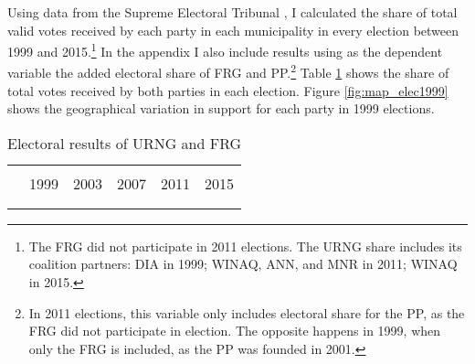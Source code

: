 \documentclass[12pt, notitlepage]{article}
\begin{document}
Using data from the Supreme Electoral Tribunal \citep{TSE:2019aa}, I calculated the share of total valid votes received by each party in each municipality in every election between 1999 and 2015.\footnote{The FRG did not participate in 2011 elections. The URNG share includes its coalition partners: DIA in 1999; WINAQ, ANN, and MNR in 2011; WINAQ in 2015.}
In the appendix I also include results using as the dependent variable the added electoral share of FRG and PP.\footnote{In 2011 elections, this variable only includes electoral share for the PP, as the FRG did not participate in election. The opposite happens in 1999, when only the FRG is included, as the PP was founded in 2001.}
Table \ref{tab:elec_results} shows the share of total votes received by both parties in each election.
Figure \ref{fig:map_elec1999} shows the geographical variation in support for each party in 1999 elections.

\begin{figure*}[!ht]
    \centering

    \begin{minipage}{1\textwidth}
      \centering
      \hspace{25pt}
    \end{minipage}

    \caption{Electoral results in 1999} \label{fig:map_elec1999}

\end{figure*}

\vspace{15pt}
\begin{table}[!htbp] \centering
  \caption{Electoral results of URNG and FRG}
  \label{tab:elec_results}
\small
  \begin{tabular}{lccccc}
  \\[-1.8ex]\hline
  \hline \\[-1.8ex]
    & 1999 & 2003 & 2007 & 2011 & 2015 \\
  \hline \\[-1.8ex]
  
  
  \hline
  \hline \\[-1.8ex]
  \end{tabular}
\end{table}
\end{document}
